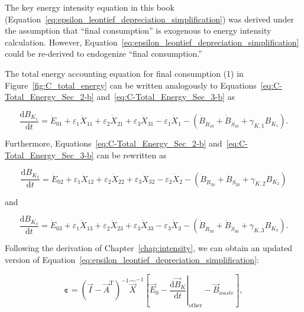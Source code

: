 The key energy intensity equation in this book
(Equation~\ref{eq:epsilon_leontief_depreciation_simplification})
was derived under the assumption that ``final consumption''
is exogenous to energy intensity calculation.
However, Equation~\ref{eq:epsilon_leontief_depreciation_simplification}
could be re-derived to endogenize 
``final consumption.''

The total energy accounting equation for final consumption (1)
in Figure~\ref{fig:C_total_energy} can be written 
analogously to Equations~\ref{eq:C-Total_Energy_Sec_2-b}
and~\ref{eq:C-Total_Energy_Sec_3-b} as

\begin{equation} \label{eq:C-Total_Energy_Sec_1-unfinished}
	\frac{\mathrm{d}B_{K_{1}}}{\mathrm{d}t}
	= \dot{E}_{01}
	+ \varepsilon_{1} \dot{X}_{11}
	+ \varepsilon_{2} \dot{X}_{21}
	+ \varepsilon_{3} \dot{X}_{31}
	- \varepsilon_{1} \dot{X}_{1}
	- \left( \dot{B}_{\dot{R}_{10}} 
							+ \dot{B}_{\dot{S}_{10}}
							+ \gamma_{K,1} B_{K_{1}}
							\right).
\end{equation}

\noindent{}Furthermore, Equations~\ref{eq:C-Total_Energy_Sec_2-b}
and~\ref{eq:C-Total_Energy_Sec_3-b}
can be rewritten as 

\begin{equation} \label{eq:C-Total_Energy_Sec_2-unfinished}
	\frac{\mathrm{d}B_{K_{2}}}{\mathrm{d}t}
	= \dot{E}_{02}
	+ \varepsilon_{1} \dot{X}_{12}
	+ \varepsilon_{2} \dot{X}_{22}
	+ \varepsilon_{3} \dot{X}_{32}
	- \varepsilon_{2} \dot{X}_{2}
	- \left( \dot{B}_{\dot{R}_{20}} 
							+ \dot{B}_{\dot{S}_{20}}
							+ \gamma_{K,2} B_{K_{2}}
							\right)
\end{equation}

\noindent{}and

\begin{equation} \label{eq:C-Total_Energy_Sec_3-unfinished}
	\frac{\mathrm{d}B_{K_{3}}}{\mathrm{d}t}
	= \dot{E}_{03}
	+ \varepsilon_{1} \dot{X}_{13}
	+ \varepsilon_{2} \dot{X}_{23}
	+ \varepsilon_{3} \dot{X}_{33}
	- \varepsilon_{3} \dot{X}_{3}
	- \left( \dot{B}_{\dot{R}_{30}} 
							+ \dot{B}_{\dot{S}_{30}}
							+ \gamma_{K,3} B_{K_{3}}
							\right).
\end{equation}

\noindent{}Following the derivation of Chapter~\ref{chap:intensity},
we can obtain an updated version 
of Equation~\ref{eq:epsilon_leontief_depreciation_simplification}:

\begin{equation} \label{eq:epsilon_leontief_depreciation_simplification_demand_endogenized}
	\boldsymbol{\varepsilon} 
	= {(\vec{I} - \vec{A}^{\mathrm{T}})}^{-1}\hat{\vec{X}}^{-1}
		\left[\vec{E}_{0} 
				- \left. \frac{\mathrm{d}\vec{B}_{K}}{\mathrm{d}t} \right|_{\mathrm{other}}
				- \vec{B}_{waste}
		\right],
\end{equation}

